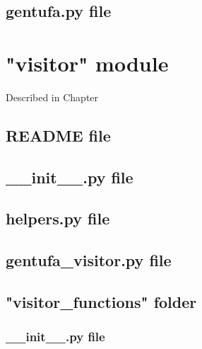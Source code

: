 

\section{gentufa.py file}



\chapter{"visitor" module}
\label{appendix:gentufa-visitor-annex}

Described in Chapter %

\section{README file}



\section{\_\_init\_\_.py file}



\section{helpers.py file}



\section{gentufa\_visitor.py file}



\section{"visitor\_functions" folder}

\subsection{\_\_init\_\_.py file}



